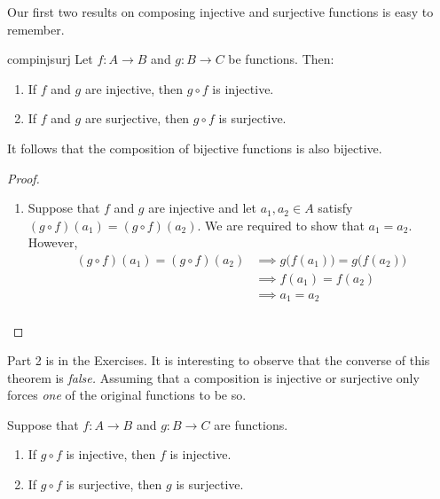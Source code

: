 Our first two results on composing injective and surjective functions is easy to remember.

\begin{thm}{}{compinjsurj}
Let $f:A\to B$ and $g:B\to C$ be functions. Then:
\begin{enumerate}
  \item If $f$ and $g$ are injective, then $g\circ f$ is injective.
  \item If $f$ and $g$ are surjective, then $g\circ f$ is surjective.
\end{enumerate}
It follows that the composition of bijective functions is also bijective.
\end{thm}

\begin{proof}
\begin{enumerate}
  \item Suppose that $f$ and $g$ are injective and let $a_1,a_2\in A$ satisfy $(g\circ f)(a_1)=(g\circ f)(a_2)$. We are required to show that $a_1=a_2$. However,
  \begin{align*}
  (g\circ f)(a_1)=(g\circ f)(a_2)&\implies g\big(f(a_1)\big)=g\big(f(a_2)\big)\\
  &\implies f(a_1)=f(a_2)\tag*{(since $g$ is injective)}\\
  &\implies a_1=a_2\tag*{(since $f$ is injective)}\\[-25pt]
  \end{align*}\qedhere
\end{enumerate}
\end{proof}

 Part 2 is in the Exercises. It is interesting to observe that the converse of this theorem is \emph{false.} Assuming that a composition is injective or surjective only forces \emph{one} of the original functions to be so.

\begin{thm}{}{}
Suppose that $f:A\to B$ and $g:B\to C$ are functions.
\begin{enumerate}
  \item If $g\circ f$ is injective, then $f$ is injective.
  \item If $g\circ f$ is surjective, then $g$ is surjective.
\end{enumerate}
\end{thm}

